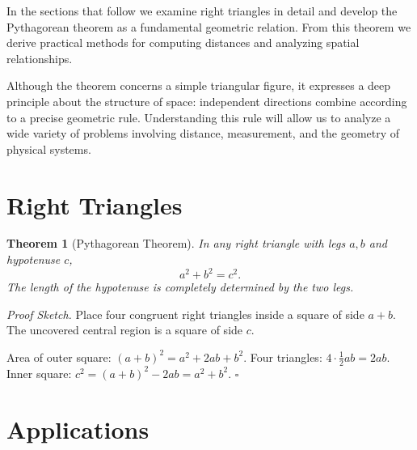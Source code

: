 \documentclass[11pt, openany]{book}
\theoremstyle{plain}
\newtheorem{theorem}{Theorem}[chapter]
\theoremstyle{definition}
\theoremstyle{remark}
\newenvironment{proofsketch}{\noindent\textit{Proof Sketch.}\;}{\hfill$\square$\par\medskip}
\begin{document}
\medskip

In the sections that follow we examine right triangles in detail and
develop the Pythagorean theorem as a fundamental geometric relation.
From this theorem we derive practical methods for computing distances
and analyzing spatial relationships.

Although the theorem concerns a simple triangular figure, it expresses a
deep principle about the structure of space: independent directions
combine according to a precise geometric rule. Understanding this rule
will allow us to analyze a wide variety of problems involving distance,
measurement, and the geometry of physical systems.

\section{Right Triangles}

\begin{theorem}[Pythagorean Theorem]
In any right triangle with legs $a,b$ and hypotenuse $c$,
\[
  a^2+b^2=c^2.
\]
The length of the hypotenuse is completely determined by the two legs.
\end{theorem}

\begin{proofsketch}
Place four congruent right triangles inside a square of side $a+b$.
The uncovered central region is a square of side $c$.

\begin{center}
\end{center}
Area of outer square: $(a+b)^2=a^2+2ab+b^2$. Four triangles: $4\cdot\tfrac12ab=2ab$.
Inner square: $c^2=(a+b)^2-2ab=a^2+b^2$.
\end{proofsketch}

\section{Applications}
\end{document}

